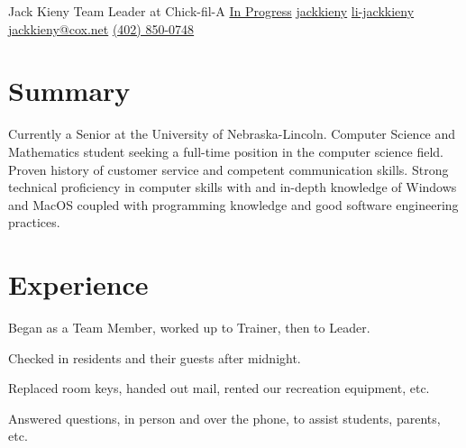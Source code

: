 \documentclass[]{latex/resume}
\begin{document}
%
%

\namesection
    {Jack}
    {Kieny}
    {Team Leader at Chick-fil-A}
    {\contactline
        {\href{}{In Progress}}
        {\href{https://www.github.com/jackkieny}{jackkieny}}
        {\href{https://www.linkedin.com/in/jackkieny}{li-jackkieny}}
        {\href{mailto:first.last@mail.com}{jackkieny@cox.net}}
        {\href{tel:+1402850047}{(402) 850-0748}}
    }

%
%

\begin{minipage}[t]{0.75\textwidth} 

\section{Summary}
Currently a Senior at the University of Nebraska-Lincoln. Computer Science and Mathematics student seeking a full-time position in the computer science field. 
Proven history of customer service and competent communication skills. 
Strong technical proficiency in computer skills with and in-depth knowledge of Windows and MacOS coupled with programming knowledge and good software engineering practices.

\sectionsep


\section{Experience}
     
    \vspace{\topsep} %
    \begin{tightemize}
        \sectionsep
            \item 
            \item 
            \item Began as a Team Member, worked up to Trainer, then to Leader.
    \end{tightemize}
    
    \sectionsep

     
    \begin{tightemize}
        \sectionsep
            \item Checked in residents and their guests after midnight.
            \item Replaced room keys, handed out mail, rented our recreation equipment, etc.
            \item Answered questions, in person and over the phone, to assist students, parents, etc.
        \end{tightemize}


\end{minipage}
\end{document}
